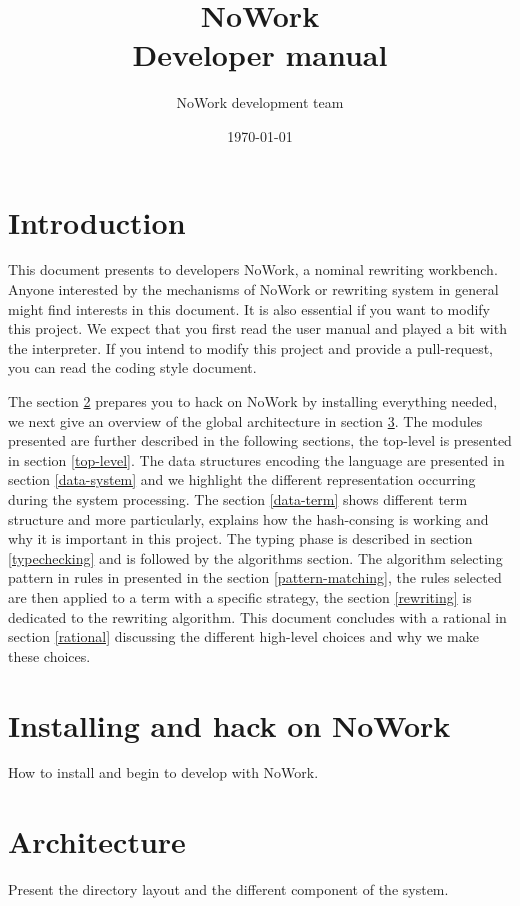 \documentclass[12pt,a4paper]{article}
\title{NoWork\\
Developer manual}
\author{NoWork development team\\[2em]}
\date\today
\begin{document}
\maketitle

\section{Introduction}

This document presents to developers NoWork, a nominal rewriting workbench. Anyone interested by the mechanisms of NoWork or rewriting system in general might find interests in this document. It is also essential if you want to modify this project. We expect that you first read the user manual and played a bit with the interpreter. If you intend to modify this project and provide a pull-request, you can read the coding style document.
\newline

The section \ref{install} prepares you to hack on NoWork by installing everything needed, we next give an overview of the global architecture in section \ref{architecture}. The modules presented are further described in the following sections, the top-level is presented in section \ref{top-level}. The data structures encoding the language are presented in section \ref{data-system} and we highlight the different representation occurring during the system processing. The section \ref{data-term} shows different term structure and more particularly, explains how the hash-consing is working and why it is important in this project. The typing phase is described in section \ref{typechecking} and is followed by the algorithms section. The algorithm selecting pattern in rules in presented in the section \ref{pattern-matching}, the rules selected are then applied to a term with a specific strategy, the section \ref{rewriting} is dedicated to the rewriting algorithm. This document concludes with a rational in section \ref{rational} discussing the different high-level choices and why we make these choices.

\section{Installing and hack on NoWork}
\label{install}
How to install and begin to develop with NoWork.

\section{Architecture}
\label{architecture}
Present the directory layout and the different component of the system.
\end{document}

